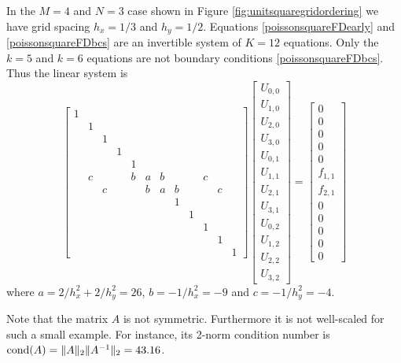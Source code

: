 \medskip\noindent\hrulefill
\begin{example} In the $M=4$ and $N=3$ case shown in Figure \ref{fig:unitsquaregridordering} we have grid spacing $h_x=1/3$ and $h_y=1/2$.  Equations \eqref{poissonsquareFDearly} and \eqref{poissonsquareFDbcs} are an invertible system of $K=12$ equations.  Only the $k=5$ and $k=6$ equations are not boundary conditions \eqref{poissonsquareFDbcs}.  Thus the linear system is
\setcounter{MaxMatrixCols}{20}
\begin{equation*}
\begin{bmatrix}
1 &  &  &  &  &  &  &  &  &  &  &  \\
  & 1&  &  &  &  &  &  &  &  &  &  \\
  &  & 1&  &  &  &  &  &  &  &  &  \\
  &  &  & 1&  &  &  &  &  &  &  &  \\
  &  &  &  & 1&  &  &  &  &  &  &  \\
  & c&  &  & b& a& b&  &  & c&  &  \\
  &  & c&  &  & b& a& b&  &  & c&  \\
  &  &  &  &  &  &  & 1&  &  &  &  \\
  &  &  &  &  &  &  &  & 1&  &  &  \\
  &  &  &  &  &  &  &  &  & 1&  &  \\
  &  &  &  &  &  &  &  &  &  & 1&  \\
  &  &  &  &  &  &  &  &  &  &  & 1
\end{bmatrix}
\begin{bmatrix}
U_{0,0} \\
U_{1,0} \\
U_{2,0} \\
U_{3,0} \\
U_{0,1} \\
U_{1,1} \\
U_{2,1} \\
U_{3,1} \\
U_{0,2} \\
U_{1,2} \\
U_{2,2} \\
U_{3,2}
\end{bmatrix}
=
\begin{bmatrix}
0 \\
0 \\
0 \\
0 \\
0 \\
f_{1,1} \\
f_{2,1} \\
0 \\
0 \\
0 \\
0 \\
0
\end{bmatrix}
\end{equation*}
where $a = 2/h_x^2 + 2/h_y^2 = 26$, $b = - 1/h_x^2 = -9$ and $c = - 1/h_y^2 = -4$.

Note that the matrix $A$ is not symmetric.  Furthermore it is not well-scaled for such a small example.  For instance, its 2-norm condition number \citep{TrefethenBau} is $\operatorname{cond}(A) = \|A\|_2 \|A^{-1}\|_2 = 43.16$.
\end{example}
\noindent\hrulefill


